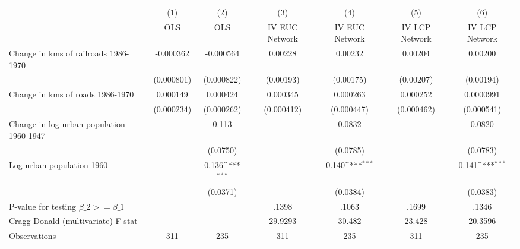 {
\def\sym#1{\ifmmode^{#1}\else\(^{#1}\)\fi}
\begin{tabular}{l*{6}{c}}
\hline\hline
                &\multicolumn{1}{c}{(1)}&\multicolumn{1}{c}{(2)}&\multicolumn{1}{c}{(3)}&\multicolumn{1}{c}{(4)}&\multicolumn{1}{c}{(5)}&\multicolumn{1}{c}{(6)}\\
                &\multicolumn{1}{c}{OLS}&\multicolumn{1}{c}{OLS}&\multicolumn{1}{c}{IV EUC Network}&\multicolumn{1}{c}{IV EUC Network}&\multicolumn{1}{c}{IV LCP Network}&\multicolumn{1}{c}{IV LCP Network}\\
\hline
Change in kms of railroads 1986-1970&-0.000362         &-0.000564         &  0.00228         &  0.00232         &  0.00204         &  0.00200         \\
                &(0.000801)         &(0.000822)         &(0.00193)         &(0.00175)         &(0.00207)         &(0.00194)         \\
[1em]
Change in kms of roads 1986-1970& 0.000149         & 0.000424         & 0.000345         & 0.000263         & 0.000252         &0.0000991         \\
                &(0.000234)         &(0.000262)         &(0.000412)         &(0.000447)         &(0.000462)         &(0.000541)         \\
[1em]
Change in log urban population 1960-1947&                  &    0.113         &                  &   0.0832         &                  &   0.0820         \\
                &                  & (0.0750)         &                  & (0.0785)         &                  & (0.0783)         \\
[1em]
Log urban population 1960&                  &    0.136\sym{***}&                  &    0.140\sym{***}&                  &    0.141\sym{***}\\
                &                  & (0.0371)         &                  & (0.0384)         &                  & (0.0383)         \\
\hline
P-value for testing $\beta\_{2} >= \beta\_{1}$&                  &                  &    .1398         &    .1063         &    .1699         &    .1346         \\
Cragg-Donald (multivariate) F-stat&                  &                  &  29.9293         &   30.482         &   23.428         &  20.3596         \\
Observations    &      311         &      235         &      311         &      235         &      311         &      235         \\
\hline\hline
\end{tabular}
}
